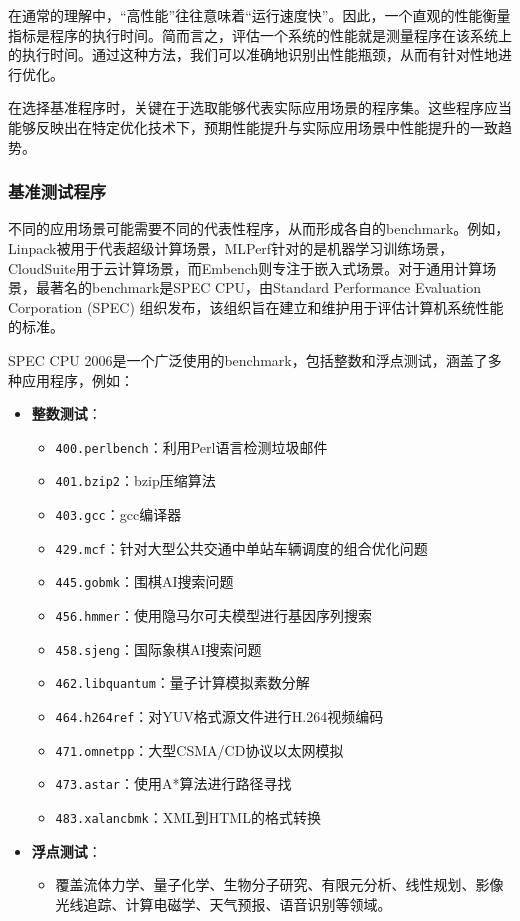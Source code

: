 在通常的理解中，``高性能''往往意味着``运行速度快''。因此，一个直观的性能衡量指标是程序的执行时间。简而言之，评估一个系统的性能就是测量程序在该系统上的执行时间。通过这种方法，我们可以准确地识别出性能瓶颈，从而有针对性地进行优化。

在选择基准程序时，关键在于选取能够代表实际应用场景的程序集。这些程序应当能够反映出在特定优化技术下，预期性能提升与实际应用场景中性能提升的一致趋势。

\subsubsection{基准测试程序}\label{sec:09-cache-024}

不同的应用场景可能需要不同的代表性程序，从而形成各自的benchmark。例如，Linpack被用于代表超级计算场景，MLPerf针对的是机器学习训练场景，CloudSuite用于云计算场景，而Embench则专注于嵌入式场景。对于通用计算场景，最著名的benchmark是SPEC CPU，由Standard Performance Evaluation Corporation (SPEC) 组织发布，该组织旨在建立和维护用于评估计算机系统性能的标准。

SPEC CPU 2006是一个广泛使用的benchmark，包括整数和浮点测试，涵盖了多种应用程序，例如：

\begin{itemize}
\tightlist
\item
  \textbf{整数测试}：

  \begin{itemize}
  \tightlist
  \item
    \texttt{400.perlbench}：利用Perl语言检测垃圾邮件
  \item
    \texttt{401.bzip2}：bzip压缩算法
  \item
    \texttt{403.gcc}：gcc编译器
  \item
    \texttt{429.mcf}：针对大型公共交通中单站车辆调度的组合优化问题
  \item
    \texttt{445.gobmk}：围棋AI搜索问题
  \item
    \texttt{456.hmmer}：使用隐马尔可夫模型进行基因序列搜索
  \item
    \texttt{458.sjeng}：国际象棋AI搜索问题
  \item
    \texttt{462.libquantum}：量子计算模拟素数分解
  \item
    \texttt{464.h264ref}：对YUV格式源文件进行H.264视频编码
  \item
    \texttt{471.omnetpp}：大型CSMA/CD协议以太网模拟
  \item
    \texttt{473.astar}：使用A*算法进行路径寻找
  \item
    \texttt{483.xalancbmk}：XML到HTML的格式转换
  \end{itemize}
\item
  \textbf{浮点测试}：

  \begin{itemize}
  \tightlist
  \item
    覆盖流体力学、量子化学、生物分子研究、有限元分析、线性规划、影像光线追踪、计算电磁学、天气预报、语音识别等领域。
  \end{itemize}
\end{itemize}

